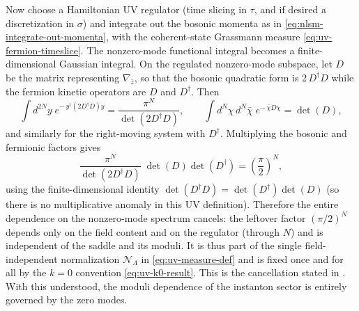 \documentclass[12pt]{article}
\begin{document}
Now choose a Hamiltonian UV regulator (time slicing in $\tau$, and if desired a
discretization in $\sigma$) and integrate out the bosonic momenta as in
\eqref{eq:nlsm-integrate-out-momenta}, with the coherent-state Grassmann measure
\eqref{eq:uv-fermion-timeslice}. The nonzero-mode functional integral becomes a
finite-dimensional Gaussian integral. On the regulated nonzero-mode subspace,
let $D$ be the matrix representing $\nabla_{\bar z}$, so that the bosonic
quadratic form is $2\,D^\dagger D$ while the fermion kinetic operators are $D$
and $D^\dagger$. Then
\begin{equation}
  \int d^{2N}y\;e^{-\,y^\dagger(2D^\dagger D)y}
  =\frac{\pi^{N}}{\det(2D^\dagger D)},
  \qquad
  \int d^{N}\chi\,d^{N}\bar\chi\;e^{-\,\bar\chi D\chi}=\det(D),
  \label{eq:uv-gaussian-det-identity}
\end{equation}
and similarly for the right-moving system with $D^\dagger$. Multiplying the
bosonic and fermionic factors gives
\begin{equation}
  \frac{\pi^{N}}{\det(2D^\dagger D)}\;\det(D)\det(D^\dagger)
  =\left(\frac{\pi}{2}\right)^{N},
  \label{eq:uv-nzm-cancelled}
\end{equation}
using the finite-dimensional identity $\det(D^\dagger D)=\det(D^\dagger)\det(D)$
(so there is no multiplicative anomaly in this UV definition). Therefore the
entire dependence on the nonzero-mode spectrum cancels: the leftover factor
$(\pi/2)^N$ depends only on the field content and on the regulator (through $N$)
and is independent of the saddle and its moduli. It is thus part of the single
field-independent normalization $\mathcal{N}_\Lambda$ in \eqref{eq:uv-measure-def}
and is fixed once and for all by the $k=0$ convention \eqref{eq:uv-k0-result}.
This is the cancellation stated in \cite[Sec.~19.5.4, after Eq.~(19.200)]{Yin:FoundationsStringTheory}.
With this understood, the moduli dependence of the instanton sector is entirely
governed by the zero modes.
\end{document}
